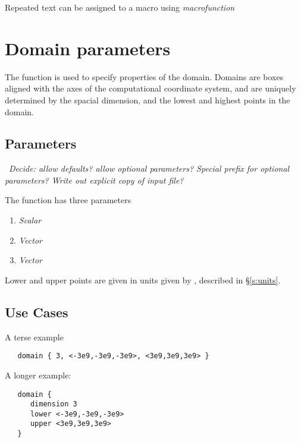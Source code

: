 \documentclass{book}
\begin{document}
Repeated text can be assigned to a macro using \textit{macro}\code{ = }\textit{function}

\section{Domain parameters} \label{s:domain}

The  function is used to specify properties of the
domain.  Domains are boxes aligned with the axes of the computational
coordinate system, and are uniquely determined by the spacial
dimension, and the lowest and highest points in the domain.

\subsection{Parameters}

 \todo\ \textit{Decide: allow defaults?  allow optional parameters?  Special
  prefix for optional parameters?  Write out explicit copy
 of input file?}

The  function has three parameters
\begin{enumerate}
\item \textit{Scalar} 
\item \textit{Vector} 
\item \textit{Vector} 
\end{enumerate}

Lower and upper points are given in units given by ,
described in \S\ref{s:units}.

\subsection{Use Cases}

A terse example
\begin{verbatim}
   domain { 3, <-3e9,-3e9,-3e9>, <3e9,3e9,3e9> }
\end{verbatim}

A longer example:
\begin{verbatim}
   domain { 
      dimension 3
      lower <-3e9,-3e9,-3e9>
      upper <3e9,3e9,3e9>
   }
\end{verbatim}
\end{document}
